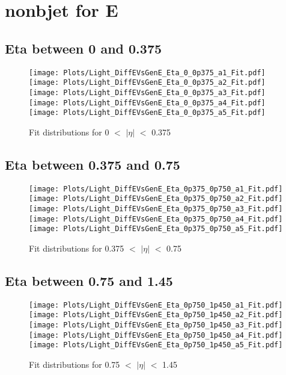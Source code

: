 \documentclass[a4paper,10pt]{article}
\begin{document}
\newpage 
\section{nonbjet for E}
 \subsection{Eta between 0 and 0.375}
 \begin{figure}[h!b] 
  \texttt{[image: Plots/Light\_DiffEVsGenE\_Eta\_0\_0p375\_a1\_Fit.pdf]} 
  \texttt{[image: Plots/Light\_DiffEVsGenE\_Eta\_0\_0p375\_a2\_Fit.pdf]} \\ 
  \texttt{[image: Plots/Light\_DiffEVsGenE\_Eta\_0\_0p375\_a3\_Fit.pdf]} 
  \texttt{[image: Plots/Light\_DiffEVsGenE\_Eta\_0\_0p375\_a4\_Fit.pdf]} \\ 
  \texttt{[image: Plots/Light\_DiffEVsGenE\_Eta\_0\_0p375\_a5\_Fit.pdf]} 
 \caption{Fit distributions for 0 $<$ $\vert \eta \vert$ $<$ 0.375}
 \end{figure}
 \newpage 
 \subsection{Eta between 0.375 and 0.75}
 \begin{figure}[h!b] 
  \texttt{[image: Plots/Light\_DiffEVsGenE\_Eta\_0p375\_0p750\_a1\_Fit.pdf]} 
  \texttt{[image: Plots/Light\_DiffEVsGenE\_Eta\_0p375\_0p750\_a2\_Fit.pdf]} \\ 
  \texttt{[image: Plots/Light\_DiffEVsGenE\_Eta\_0p375\_0p750\_a3\_Fit.pdf]} 
  \texttt{[image: Plots/Light\_DiffEVsGenE\_Eta\_0p375\_0p750\_a4\_Fit.pdf]} \\ 
  \texttt{[image: Plots/Light\_DiffEVsGenE\_Eta\_0p375\_0p750\_a5\_Fit.pdf]} 
 \caption{Fit distributions for 0.375 $<$ $\vert \eta \vert$ $<$ 0.75}
 \end{figure}
 \newpage 
 \subsection{Eta between 0.75 and 1.45}
 \begin{figure}[h!b] 
  \texttt{[image: Plots/Light\_DiffEVsGenE\_Eta\_0p750\_1p450\_a1\_Fit.pdf]} 
  \texttt{[image: Plots/Light\_DiffEVsGenE\_Eta\_0p750\_1p450\_a2\_Fit.pdf]} \\ 
  \texttt{[image: Plots/Light\_DiffEVsGenE\_Eta\_0p750\_1p450\_a3\_Fit.pdf]} 
  \texttt{[image: Plots/Light\_DiffEVsGenE\_Eta\_0p750\_1p450\_a4\_Fit.pdf]} \\ 
  \texttt{[image: Plots/Light\_DiffEVsGenE\_Eta\_0p750\_1p450\_a5\_Fit.pdf]} 
 \caption{Fit distributions for 0.75 $<$ $\vert \eta \vert$ $<$ 1.45}
 \end{figure}
 \newpage 
\end{document}
